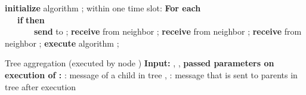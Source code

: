 \documentclass[11pt]{article}
\begin{document}
\begin{algorithm}[ht]
\begin{algorithmic}[1]
\STATE \textbf{initialize} algorithm ;
\FOR{}
        \STATE within one time slot:
        \newline \textbf{For each}  \\
                 \ \ \ \textbf{if}  \textbf{then}\\
                         \ \ \ \ \ \ \ \textbf{send}  to ;
        \newline \textbf{receive}  from neighbor ;
        \newline \textbf{receive}  from neighbor ;
        \newline 
        \newline \textbf{receive}  from neighbor ;
        \FOR{}
                \IF{}
                        \STATE \textbf{execute} algorithm ;
                \ENDIF
        \ENDFOR
\ENDFOR
\end{algorithmic}
\caption{Tree aggregation (executed by node ) \newline
        \textbf{Input:} , ,    \newline
        \textbf{passed parameters on execution of :} : message of a child in tree , : message that is sent to parents in tree  after execution}
\label{alg:TreeAggregating}
\end{algorithm}
\end{document}
